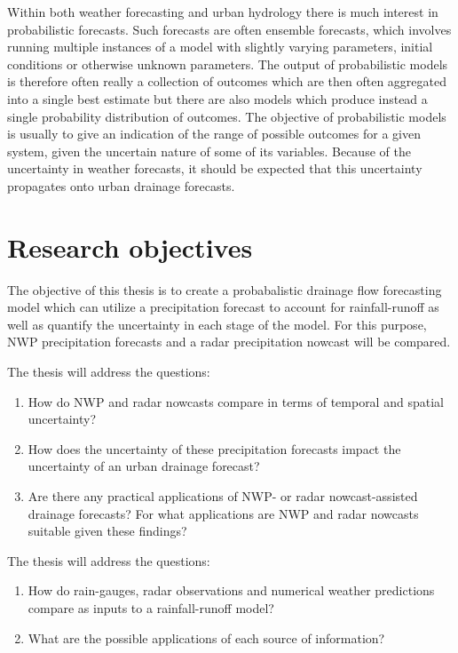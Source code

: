 Within both weather forecasting and urban hydrology there is much interest in probabilistic forecasts. Such forecasts are often ensemble forecasts, which involves running multiple instances of a model with slightly varying parameters, initial conditions or otherwise unknown parameters. The output of probabilistic models is therefore often really a collection of outcomes which are then often aggregated into a single best estimate but there are also models which produce instead a single probability distribution of outcomes. The objective of probabilistic models is usually to give an indication of the range of possible outcomes for a given system, given the uncertain nature of some of its variables. Because of the uncertainty in weather forecasts, it should be expected that this uncertainty propagates onto urban drainage forecasts. 


\section{Research objectives}
The objective of this thesis is to create a probabalistic drainage flow forecasting model which can utilize a precipitation forecast to account for rainfall-runoff as well as quantify the uncertainty in each stage of the model. For this purpose, NWP precipitation forecasts and a radar precipitation nowcast will be compared. 



The thesis will address the questions:

\begin{enumerate}
  \item How do NWP and radar nowcasts compare in terms of temporal and spatial uncertainty?
  \item How does the uncertainty of these precipitation forecasts impact the uncertainty of an urban drainage forecast?
  \item Are there any practical applications of NWP- or radar nowcast-assisted drainage forecasts? 
  For what applications are NWP and radar nowcasts suitable given these findings?
\end{enumerate}

The thesis will address the questions:
\begin{enumerate}
  \item How do rain-gauges, radar observations and numerical weather predictions compare as inputs to a rainfall-runoff model?
  \item What are the possible applications of each source of information?
\end{enumerate}

